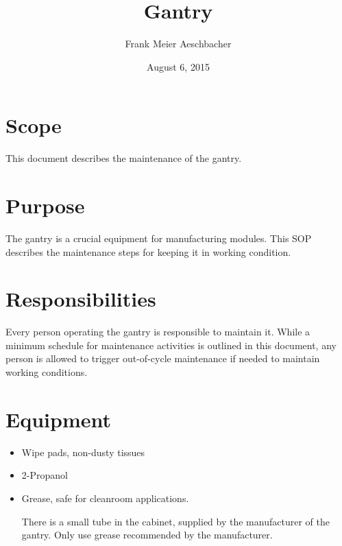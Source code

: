 \documentclass[12pt]{unlsilabsop}
\title{Gantry}
\date{August 6, 2015}
\author{Frank Meier Aeschbacher}
\begin{document}
\maketitle

\section{Scope}
This document describes the maintenance of the gantry.

\section{Purpose}
The gantry is a crucial equipment for manufacturing modules. This SOP describes the maintenance steps for keeping it in working condition.


\section{Responsibilities}
Every person operating the gantry is responsible to maintain it. While a minimum schedule for maintenance activities is outlined in this document, any person is allowed to trigger out-of-cycle maintenance if needed to maintain working conditions.

\section{Equipment}

\begin{itemize}
    \item Wipe pads, non-dusty tissues
    \item 2-Propanol
    \item Grease, safe for cleanroom applications.

    There is a small tube in the cabinet, supplied by the manufacturer of the gantry. Only use grease recommended by the manufacturer.
\end{itemize}
\end{document}

